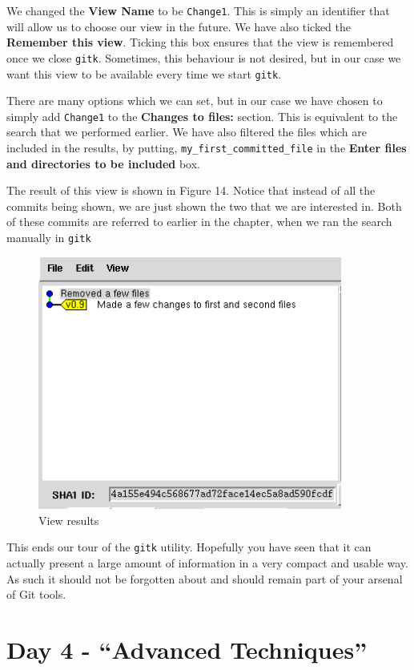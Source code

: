 We changed the \textbf{View Name} to be \texttt{Change1}.
This is simply an identifier that will allow us to choose our view in the future.
We have also ticked the \textbf{Remember this view}.
Ticking this box ensures that the view is remembered once we close \texttt{gitk}.
Sometimes, this behaviour is not desired, but in our case we want this view to be available every time we start \texttt{gitk}.

There are many options which we can set, but in our case we have chosen to simply add \texttt{Change1} to the \textbf{Changes to files:} section.
This is equivalent to the search that we performed earlier.
We have also filtered the files which are included in the results, by putting, \texttt{my\_first\_committed\_file} in the \textbf{Enter files and directories to be included} box.

The result of this view is shown in Figure 14.
Notice that instead of all the commits being shown, we are just shown the two that we are interested in.
Both of these commits are referred to earlier in the chapter, when we ran the search manually in \texttt{gitk}

\begin{figure}[hbt]
\centering
\includegraphics[width=10cm]{images/f-w5-d14.png}
\caption{View results}
\end{figure}

This ends our tour of the \texttt{gitk} utility.
Hopefully you have seen that it can actually present a large amount of information in a very compact and usable way.
As such it should not be forgotten about and should remain part of your arsenal of Git tools.

\section{Day 4 - ``Advanced Techniques''}
